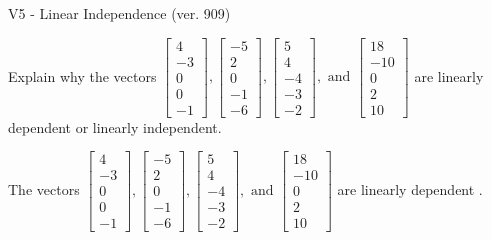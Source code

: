 \begin{exercise}
  \begin{exerciseTitle}V5 - Linear Independence (ver. 909)\end{exerciseTitle}
  \begin{exerciseStatement}
    Explain why the vectors \(\left[\begin{array}{r}
4 \\
-3 \\
0 \\
0 \\
-1
\end{array}\right] , \left[\begin{array}{r}
-5 \\
2 \\
0 \\
-1 \\
-6
\end{array}\right] , \left[\begin{array}{r}
5 \\
4 \\
-4 \\
-3 \\
-2
\end{array}\right] , \text{ and } \left[\begin{array}{r}
18 \\
-10 \\
0 \\
2 \\
10
\end{array}\right]\) are linearly dependent or linearly independent.	


  \end{exerciseStatement}
  \begin{exerciseAnswer}
   The vectors \(\left[\begin{array}{r}
4 \\
-3 \\
0 \\
0 \\
-1
\end{array}\right] , \left[\begin{array}{r}
-5 \\
2 \\
0 \\
-1 \\
-6
\end{array}\right] , \left[\begin{array}{r}
5 \\
4 \\
-4 \\
-3 \\
-2
\end{array}\right] , \text{ and } \left[\begin{array}{r}
18 \\
-10 \\
0 \\
2 \\
10
\end{array}\right]\) are 
  	 linearly dependent  .
  


  \end{exerciseAnswer}
\end{exercise}
